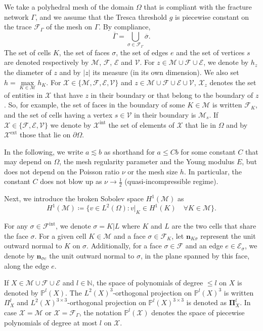 \documentclass[a4paper,11pt]{article}
\newcounter{example}[section]
\theoremstyle{definition}
\theoremstyle{remark}
\newcommand{\bo}[1]{\mathbf{#1}}
\newcommand{\bos}[1]{\boldsymbol{#1}}
\def\ext{\text{ext}}
\def\inte{\text{int}}
\def\cE{\mathcal{E}}
\def\cF{\mathcal{F}}
\def\cM{\mathcal{M}}
\def\cV{\mathcal{V}}
\def\O{\Omega}
\def\Ksig{{K\!\sigma}}
\begin{document}
We take a polyhedral mesh of the domain $\O$ that is compliant with the fracture network $\Gamma$, and we assume that the Tresca threshold $g$ is piecewise constant on the trace $\cF_\Gamma$ of the mesh on $\Gamma$. By compliance,
$$
  \overline{\Gamma}=\bigcup\limits_{\sigma\in\cF_\Gamma}\overline{\sigma}.
$$
The set of cells $K$, the set of faces $\sigma$, the set of edges $e$ and the set of vertices $s$ are denoted respectively by $\cM$, $\cF$, $\cE$ and $\cV$. For $z\in\cM\cup\cF\cup\cE$, we denote by $h_z$ the diameter of $z$  and by $|z|$ its measure (in its own dimension). We also set $h=\max\limits_{K\in\mathcal M}h_K$. 
For $\mathcal X\in\{\cM,\cF,\cE,\cV\}$ and $z\in\cM\cup\cF\cup\cE\cup\cV$, $\mathcal X_z$ denotes the set of entities in $\mathcal X$ that have $z$ in their boundary or that belong to the boundary of $z$. So, for example, the set of faces in the boundary of some $K\in\cM$ is written $\cF_K$, and the set of cells having a vertex $s\in\cV$ in their boundary is $\cM_s$. If $\mathcal X\in\{\cF,\cE,\cV\}$ we denote by $\mathcal X^\inte$ the set of elements of $\mathcal X$ that lie in $\Omega$ and by $\mathcal X^\ext$ those that lie on $\partial\Omega$.

In the following, we write $a\lesssim b$ as shorthand for $a\le Cb$ for some constant $C$ that may depend on $\Omega$, the mesh regularity parameter and the Young modulus $E$, but does not depend on the Poisson ratio $\nu$ or the mesh size $h$. In particular, the constant $C$ does not blow up as $\nu\to \frac12$ (quasi-incompressible regime).

Next, we introduce the broken Sobolev space $H^1(\cM)$ as 
$$
  H^1(\cM)\coloneqq \{v\in L^2(\O):v|_K\in H^1(K)\quad\forall K\in\cM\}.
$$

For any $\sigma\in \cF^\inte$, we denote $\sigma=K|L$ where $K$ and $L$ are the two cells that share the face $\sigma$. For a given cell $K\in\cM$ and a face $\sigma\in\cF_K$, let $\mathbf{n}_{\Ksig}$ represent the unit outward normal to $K$ on $\sigma$. Additionally, for a face $\sigma\in\cF$ and an edge $e\in\cE_\sigma$, we denote by $\bo{n}_{\sigma e}$ the unit outward normal to $\sigma$, in the plane spanned by this face, along the edge $e$.

If $ X \in \mathcal{M} \cup \mathcal{F} \cup \mathcal{E}$ and $ l \in \mathbb{N} $, the space of polynomials of degree $\le l$ on $X$ is denoted by $\mathbb{P}^l(X)$. The $L^2(X)^3$-orthogonal projection on $\mathbb{P}^l(X)^3$ is written $\Pi^l_X$ and $L^2(X)^{3\times 3}$-orthogonal projection on $\mathbb P^l(X)^{3\times 3}$ is denoted as $\bos{\Pi}^l_X$. In case $\mathcal{X}=\mathcal{M}$ or  $\mathcal{X} = \mathcal{F}_\Gamma$, the notation $\mathbb{P}^l(\mathcal{X})$ denotes the space of piecewise polynomials of degree at most $l$ on $\mathcal{X}.$
\end{document}
